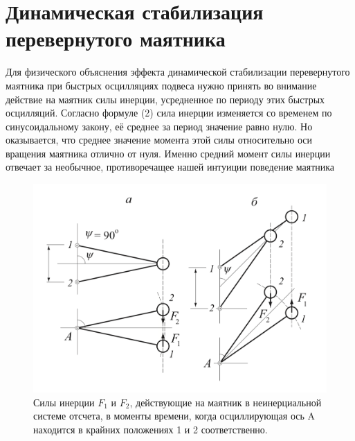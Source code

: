 \documentclass[a4paper,12pt]{article} %
\begin{document}
\section{Динамическая стабилизация перевернутого маятника}
Для физического объяснения эффекта динамической стабилизации перевернутого маятника при быстрых осцилляциях подвеса нужно принять во внимание действие на маятник силы инерции, усредненное по периоду этих быстрых осцилляций. Согласно формуле (2) сила инерции изменяется со временем по синусоидальному закону, её среднее за период значение равно нулю. Но оказывается, что среднее значение момента этой силы относительно оси вращения маятника отлично от нуля. Именно средний момент силы инерции отвечает за необычное, противоречащее нашей интуиции поведение маятника
\begin{figure}[h]
\centering
\includegraphics[scale=0.4]{6}
\caption{Силы инерции $F_1$ и $F_2$, действующие на маятник в неинерциальной системе отсчета, в моменты времени, когда осциллирующая ось A находится в крайних положениях 1 и 2 соответственно.}
\end{figure}
\end{document}
